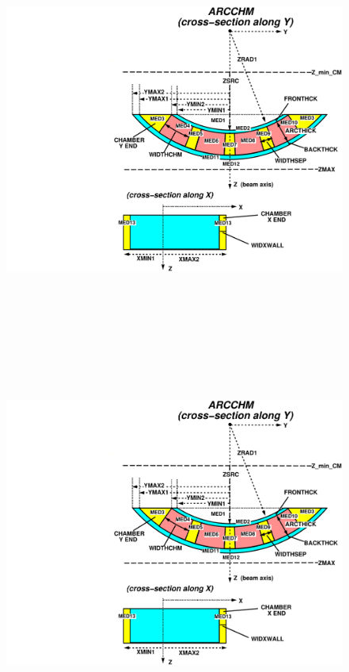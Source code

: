 \documentclass[12pt,twoside]{article}
\begin{document}
\begin{figure}[htbp]
\leavevmode
\begin{latexonly}
\hspace{-5cm}\includegraphics[height=14cm]{figures/arcchmd}
\end{latexonly}
\begin{htmlonly}
\includegraphics[height=12cm]{figures/arcchmd}

\end{htmlonly}
\end{figure}
\end{document}
